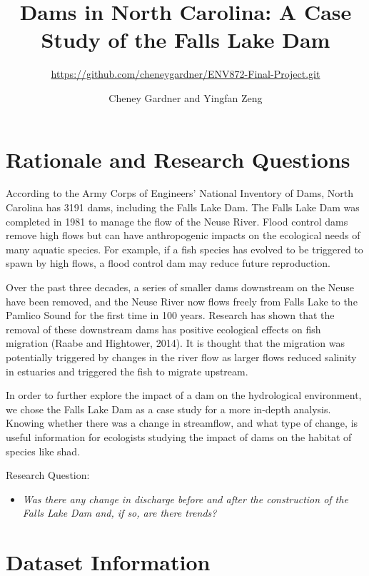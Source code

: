 \documentclass[
  12pt,
]{article}
\title{Dams in North Carolina: A Case Study of the Falls Lake Dam}
\subtitle{\url{https://github.com/cheneygardner/ENV872-Final-Project.git}}
\author{Cheney Gardner and Yingfan Zeng}
\date{}
\providecommand{\tightlist}{%
  \setlength{\itemsep}{0pt}\setlength{\parskip}{0pt}}
\begin{document}
\maketitle

\hypertarget{rationale-and-research-questions}{%
\section{Rationale and Research
Questions}\label{rationale-and-research-questions}}

According to the Army Corps of Engineers' National Inventory of Dams,
North Carolina has 3191 dams, including the Falls Lake Dam. The Falls
Lake Dam was completed in 1981 to manage the flow of the Neuse River.
Flood control dams remove high flows but can have anthropogenic impacts
on the ecological needs of many aquatic species. For example, if a fish
species has evolved to be triggered to spawn by high flows, a flood
control dam may reduce future reproduction.

Over the past three decades, a series of smaller dams downstream on the
Neuse have been removed, and the Neuse River now flows freely from Falls
Lake to the Pamlico Sound for the first time in 100 years. Research has
shown that the removal of these downstream dams has positive ecological
effects on fish migration (Raabe and Hightower, 2014). It is thought
that the migration was potentially triggered by changes in the river
flow as larger flows reduced salinity in estuaries and triggered the
fish to migrate upstream.

In order to further explore the impact of a dam on the hydrological
environment, we chose the Falls Lake Dam as a case study for a more
in-depth analysis. Knowing whether there was a change in streamflow, and
what type of change, is useful information for ecologists studying the
impact of dams on the habitat of species like shad.

Research Question:

\begin{itemize}
\tightlist
\item
  \emph{Was there any change in discharge before and after the
  construction of the Falls Lake Dam and, if so, are there trends?}
\end{itemize}

\newpage

\hypertarget{dataset-information}{%
\section{Dataset Information}\label{dataset-information}}
\end{document}
